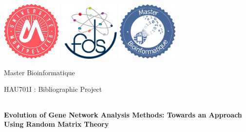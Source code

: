 \documentclass[leqno]{article}[12pt]
\begin{document}
\onehalfspace

\begin{titlepage}
    \begin{center}
	    \includegraphics[height=3cm]{Page_de_garde/logo_UM}\hspace{0.2cm}
	    \includegraphics[height=3cm]{Page_de_garde/logo_fds_rond}\hspace{0.2cm}
	    \includegraphics[height=3cm]{Page_de_garde/Logo_Bioinfo}\hspace{0.2cm}

        {\Large Master Bioinformatique\\[1cm]}

        {\large HAU701I : Bibliographic Project\\[0.7cm]}

        \vspace{3cm}

        \hrulefill\\[0.4cm]
        {\fontsize{18}{22}\textbf{Evolution of Gene Network Analysis Methods: Towards an Approach Using Random Matrix Theory}}\\[0.4cm]
        \hrulefill
    \end{center}


\end{titlepage}
\end{document}
